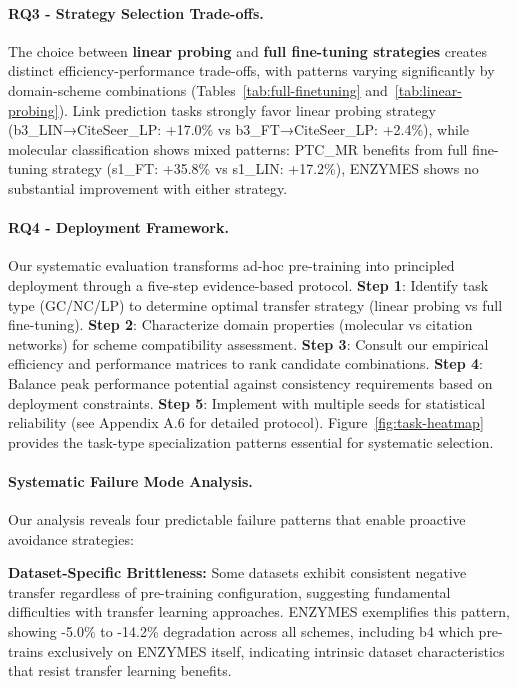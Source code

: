 \documentclass[11pt]{article}
\begin{document}
\paragraph{RQ3 - Strategy Selection Trade-offs.} The choice between \textbf{linear probing} and \textbf{full fine-tuning strategies} creates distinct efficiency-performance trade-offs, with patterns varying significantly by domain-scheme combinations (Tables~\ref{tab:full-finetuning} and~\ref{tab:linear-probing}). Link prediction tasks strongly favor linear probing strategy (b3\_LIN→CiteSeer\_LP: +17.0\% vs b3\_FT→CiteSeer\_LP: +2.4\%), while molecular classification shows mixed patterns: PTC\_MR benefits from full fine-tuning strategy (s1\_FT: +35.8\% vs s1\_LIN: +17.2\%), ENZYMES shows no substantial improvement with either strategy.

\paragraph{RQ4 - Deployment Framework.} Our systematic evaluation transforms ad-hoc pre-training into principled deployment through a five-step evidence-based protocol. \textbf{Step 1}: Identify task type (GC/NC/LP) to determine optimal transfer strategy (linear probing vs full fine-tuning). \textbf{Step 2}: Characterize domain properties (molecular vs citation networks) for scheme compatibility assessment. \textbf{Step 3}: Consult our empirical efficiency and performance matrices to rank candidate combinations. \textbf{Step 4}: Balance peak performance potential against consistency requirements based on deployment constraints. \textbf{Step 5}: Implement with multiple seeds for statistical reliability (see Appendix A.6 for detailed protocol). Figure~\ref{fig:task-heatmap} provides the task-type specialization patterns essential for systematic selection.

\paragraph{Systematic Failure Mode Analysis.} Our analysis reveals four predictable failure patterns that enable proactive avoidance strategies:

\textbf{Dataset-Specific Brittleness:} Some datasets exhibit consistent negative transfer regardless of pre-training configuration, suggesting fundamental difficulties with transfer learning approaches. ENZYMES exemplifies this pattern, showing -5.0\% to -14.2\% degradation across all schemes, including b4 which pre-trains exclusively on ENZYMES itself, indicating intrinsic dataset characteristics that resist transfer learning benefits.
\end{document}
